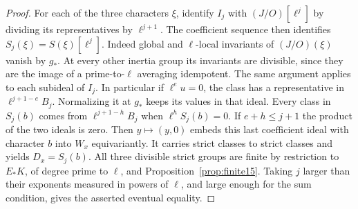 \documentclass[a4paper,11pt]{article}
\theoremstyle{definition}
\theoremstyle{remark}
\numberwithin{equation}{section}
\begin{document}
\begin{proof}
For each of the three characters \(\xi\), identify \(I_j\)
with \((J/O)[\ell^j]\) by dividing its representatives by
\(\ell^{j+1}\). The coefficient sequence then identifies
\(S_j(\xi)=S(\xi)[\ell^j]\). Indeed global and \(\ell\)-local
invariants of \((J/O)(\xi)\) vanish by \(g_*\). At every other
inertia group its invariants are divisible, since they are the
image of a prime-to-\(\ell\) averaging idempotent. The same
argument applies to each subideal of \(I_j\). In particular if
\(\ell^eu=0\), the class has a representative in
\(\ell^{j+1-e}B_j\). Normalizing it at \(g_*\) keeps its values
in that ideal. Every class in \(S_j(b)\) comes from
\(\ell^{j+1-h}B_j\) when \(\ell^h S_j(b)=0\).
If \(e+h\le j+1\) the product of the two ideals is zero. Then
\(y\mapsto(y,0)\) embeds this last coefficient ideal with
character \(b\) into \(W_x\) equivariantly. It carries strict
classes to strict classes and yields \(D_x=S_j(b)\).
All three divisible strict groups are finite by restriction
to \(E_*K\), of degree prime to \(\ell\), and
Proposition~\ref{prop:finite15}. Taking \(j\) larger than their
exponents measured in powers of \(\ell\), and large enough for
the sum condition, gives the asserted eventual equality.
\end{proof}
\end{document}
